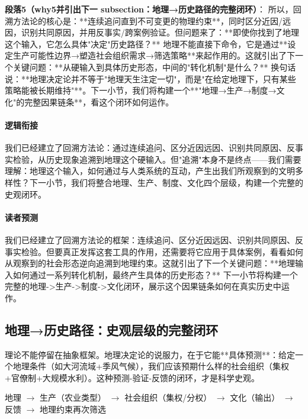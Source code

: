 \documentclass[openany, a4paper, 12pt]{book}
\newenvironment{logicmap}{
	\begin{tcolorbox}[
		colback=blue!5!white,      %
		colframe=blue!50!black,    %
		title=\textbf{逻辑地图 (Logic Map)}, %
		fonttitle=\bfseries,
		sharp corners=south,       %
		boxrule=0.5mm
		]
	\centering
	}{
	\end{tcolorbox}
}
\newenvironment{motivation}{
	\vspace{0.5em}
	\begin{tcolorbox}[
		colback=gray!10,           %
		colframe=gray!60,          %
		title=\textit{本章动机 (Motivation)},
		fonttitle=\bfseries,
		arc=0mm,                   %
		leftrule=3mm               %
		]
		\small \itshape %
	}{
	\end{tcolorbox}
	\vspace{1em}
}
\begin{document}
	\textbf{段落5（why5并引出下一 subsection：地理→历史路径的完整闭环）}：  
	所以，回溯方法论的核心是：**连续追问直到不可变更的物理约束**，同时区分近因/远因，识别共同原因，并用反事实/跨案例验证。但问题来了：**即使你找到了地理这个输入，它怎么具体"决定"历史路径？** 地理不能直接下命令，它是通过**设定生产可能性边界→塑造社会组织需求→筛选策略**来起作用的。这就引出了下一个关键问题：**从硬输入到具体历史形态，中间的"转化机制"是什么？** 换句话说：**地理决定论并不等于"地理天生注定一切"，而是"在给定地理下，只有某些策略能被长期维持"**。下一小节，我们将构建一个**"地理→生产→制度→文化"的完整因果链条**，看这个闭环如何运作。
	
	\paragraph*{逻辑衔接}
	我们已经建立了回溯方法论：通过连续追问、区分近因远因、识别共同原因、反事实检验，从历史现象追溯到地理这个硬输入。但"追溯"本身不是终点——我们需要理解：地理这个输入，如何通过与人类系统的互动，产生出我们所观察到的文明多样性？下一小节，我们将整合地理、生产、制度、文化四个层级，构建一个完整的史观闭环。
	
	\paragraph*{读者预测}
	我们已经建立了回溯方法论的框架：连续追问、区分近因远因、识别共同原因、反事实检验。但要真正发挥这套工具的作用，还需要将它应用于具体案例，看看如何从观察到的社会形态逆向追溯到地理约束。这就引出了下一个关键问题：**地理输入如何通过一系列转化机制，最终产生具体的历史形态？** 下一小节将构建一个完整的地理->生产->制度->文化闭环，展示这个因果链条如何在真实历史中运作。

	\subsection{地理→历史路径：史观层级的完整闭环}
	
	\begin{motivation}
		理论不能停留在抽象框架。地理决定论的说服力，在于它能**具体预测**：给定一个地理条件（如大河流域+季风气候），我们应该预期什么样的社会组织（集权+官僚制+大规模水利）。这种预测-验证-反馈的闭环，才是科学史观。
	\end{motivation}
	
	\begin{logicmap}
		地理 $\rightarrow$ 生产（农业类型） $\rightarrow$ 社会组织（集权/分权） $\rightarrow$ 文化（输出） $\rightarrow$ 反馈 $\rightarrow$ 地理约束再次筛选
	\end{logicmap}
	
\end{document}

